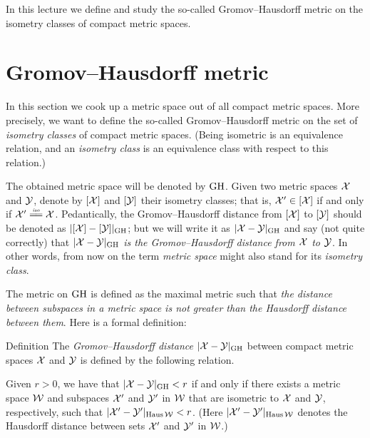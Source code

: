In this lecture we define and study the so-called Gromov--Hausdorff metric on the isometry classes of compact metric spaces.

\section{Gromov--Hausdorff metric}

In this section we cook up a metric space out of all compact metric spaces.
More precisely, we want to define the so-called  Gromov--Hausdorff metric on the set of \textit{isometry classes} of compact metric spaces.
(Being isometric is an equivalence relation, 
and an \emph{isometry class} is an equivalence class with respect to this relation.)

The obtained metric space will be denoted by $\operatorname{\rm GH}\nolimits$.
Given two metric spaces $\mathcal{X}$ and $\mathcal{Y}$,
denote by $[\mathcal{X}]$ and $[\mathcal{Y}]$ their isometry classes;
that is, $\mathcal{X}'\in [\mathcal{X}]$ if and only if $\spc{X}'\iso \spc{X}$.
Pedantically, the Gromov--Hausdorff distance from $[\mathcal{X}]$ 
to $[\mathcal{Y}]$ should be denoted as $|[\mathcal{X}]-[\mathcal{Y}]|_{\operatorname{\rm GH}\nolimits}$;
but we will write it as $|\spc{X}\z-\spc{Y}|_{\GH}$ and say (not quite correctly) that 
\textit{$|\spc{X}\z-\spc{Y}|_{\GH}$ is the Gromov--Hausdorff distance from  $\mathcal{X}$ 
to  $\mathcal{Y}$}.
In other words, from now on the term \textit{metric space} might also stand for its \textit{isometry class}.

The metric on $\operatorname{\rm GH}\nolimits$ is defined as the maximal metric such that \textit{the distance between subspaces in a metric space is not greater than the Hausdorff distance between them}.
Here is a formal definition:

\begin{thm}{Definition}\label{def:GH}
The \emph{Gromov--Hausdorff distance} $|\mathcal{X}-\mathcal{Y}|_{\operatorname{\rm GH}\nolimits}$ between compact metric spaces $\mathcal{X}$ and $\mathcal{Y}$
is defined by the following
relation.
 
Given  $r > 0$, we have that $|\mathcal{X}-\mathcal{Y}|_{\operatorname{\rm GH}\nolimits} < r$ if and only if there exists a metric
space $\mathcal{W}$ and subspaces $\mathcal{X}'$ and $\mathcal{Y}'$ in $\mathcal{W}$ that are isometric to $\mathcal{X}$ and $\mathcal{Y}$,
respectively, such that $|\mathcal{X}'-\mathcal{Y}'|_{\operatorname{\rm Haus}\nolimits\mathcal{W}} < r$. 
(Here $|\mathcal{X}'-\mathcal{Y}'|_{\operatorname{\rm Haus}\nolimits\mathcal{W}}$ denotes the Hausdorff distance between sets $\mathcal{X}'$ and $\mathcal{Y}'$ in $\mathcal{W}$.)
\end{thm}

